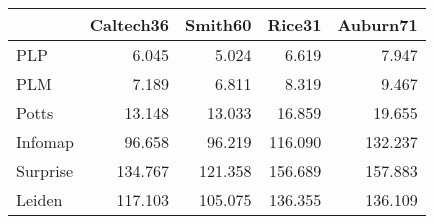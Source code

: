 \begin{tabular}{lrrrr}
\toprule
{} & Caltech36 & Smith60 &  Rice31 & Auburn71 \\
\midrule
PLP      &     6.045 &   5.024 &   6.619 &    7.947 \\
PLM      &     7.189 &   6.811 &   8.319 &    9.467 \\
Potts    &    13.148 &  13.033 &  16.859 &   19.655 \\
Infomap  &    96.658 &  96.219 & 116.090 &  132.237 \\
Surprise &   134.767 & 121.358 & 156.689 &  157.883 \\
Leiden   &   117.103 & 105.075 & 136.355 &  136.109 \\
\bottomrule
\end{tabular}
